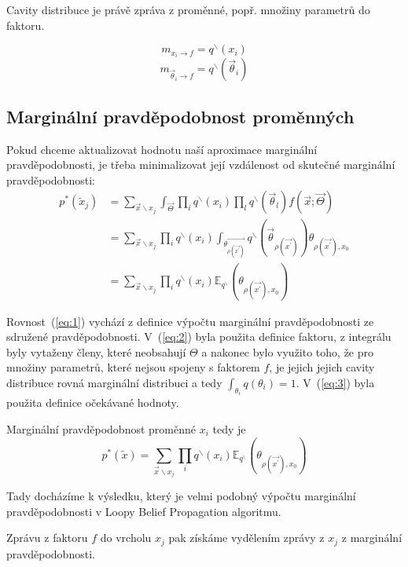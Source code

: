Cavity distribuce je právě zpráva z proměnné, popř. množiny parametrů do faktoru.

$$m_{x_i \rightarrow f} = q^\backslash (x_i)$$
$$m_{\vec\theta_i \rightarrow f} = q^\backslash (\vec\theta_i)$$

\subsection{Marginální pravděpodobnost proměnných}

Pokud chceme aktualizovat hodnotu naší aproximace marginální pravděpodobnosti,
je třeba minimalizovat její vzdálenost od skutečné marginální
pravděpodobnosti:
\begin{align}
p^*(\tilde{x}_j) &=
\sum_{\vec{x} \backslash x_j}
	\int_{\vec{\Theta}}
    		\prod_i 
			q^\backslash(x_i)
		\prod_l 
			q^\backslash(\vec{\theta}_l)
		f(\vec{x};
    		  \vec{\Theta})
\label{eq:1} 
\\
&=
\sum_{\vec{x} \backslash x_j} 
	\prod_i 
		q^\backslash(x_i)
    \int_{\vec{\theta_{\rho(\vec{x^\prime})}}}
	    q^\backslash(\vec{\theta}_{\rho(\vec{x^\prime})})
    \theta_{\rho(\vec{x^\prime}), x_0} \label{eq:2} 
\\
&= 
\sum_{\vec{x} \backslash x_j} 
	\prod_i 
		q^\backslash(x_i)
    		\mathbb{E}_{q^\backslash} 
			(\theta_{\rho(\vec{x^\prime}), x_0}) 
\label{eq:3}
\end{align}

Rovnost~(\ref{eq:1}) vychází z definice výpočtu marginální pravděpodobnosti ze
sdružené pravděpodobnosti.
V~(\ref{eq:2}) byla použita definice faktoru, z integrálu byly vytaženy členy,
které neobsahují $\Theta$ a nakonec bylo využito toho, že pro
množiny parametrů, které nejsou spojeny s faktorem $f$, je jejich jejich cavity
distribuce rovná marginální distribuci a tedy $\int_{\theta_i} q(\theta_i) =
1$. V~(\ref{eq:3}) byla použita definice očekávané hodnoty.

Marginální pravděpodobnost proměnné $x_i$ tedy je
\begin{equation}
p^*(\tilde x) =
\sum_{\vec{x} \backslash x_j} 
	\prod_i 
		q^\backslash(x_i)
    		\mathbb{E}_{q^\backslash} 
			(\theta_{\rho(\vec{x^\prime}), x_0}) 
\end{equation}

Tady docházíme k výsledku, který je velmi podobný výpočtu marginální
pravděpodobnosti v Loopy Belief Propagation algoritmu.

Zprávu z faktoru $f$ do vrcholu $x_j$ pak získáme vydělením zprávy z $x_j$ z
marginální pravděpodobnosti.

